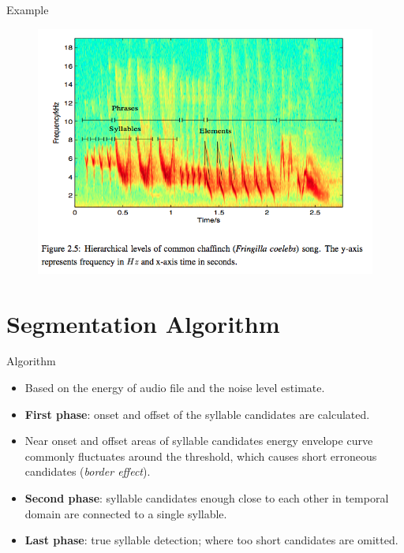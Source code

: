 \documentclass[10pt]{beamer}
\begin{document}
\begin{frame}[fragile]{Example}
\begin{figure}
\includegraphics[width=1\textwidth]{structure}
\end{figure}
\end{frame}



\section{Segmentation Algorithm}

\begin{frame}[fragile]{Algorithm}
\begin{itemize}
\item Based on the energy of audio file and the noise level estimate.
\item \textbf{First phase}: onset and offset of the syllable candidates are calculated.
\item Near onset and offset areas of syllable candidates energy envelope  curve commonly fluctuates around the threshold, which causes short
erroneous candidates (\textit{border effect}).
\item \textbf{Second phase}: syllable candidates enough close to each other in temporal domain are connected to a single syllable.
\item \textbf{Last phase}: true syllable detection; where too short candidates are omitted.	
\end{itemize}
\end{frame}
\end{document}
